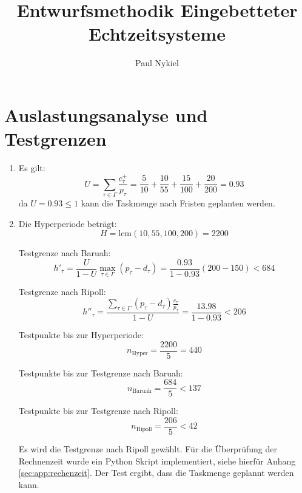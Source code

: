 \documentclass[DIN, pagenumber=false, fontsize=11pt, parskip=half]{scrartcl}
\title{Entwurfsmethodik Eingebetteter Echtzeitsysteme}
\author{Paul Nykiel}
\begin{document}
    \maketitle
    \section{Auslastungsanalyse und Testgrenzen}
    \begin{enumerate}[label=\alph*)]
        \item
            Es gilt:
            \begin{equation}
                U = \sum_{\tau \in \Gamma} \frac{c^+_\tau}{p_\tau}
                    = \frac{5}{10} + \frac{10}{55} + \frac{15}{100} + \frac{20}{200}
                    = 0.93
            \end{equation}
            da $U = 0.93 \leq 1$ kann die Taskmenge nach Fristen geplanten werden.
        \item
            Die Hyperperiode beträgt:
            \begin{equation}
                H = \text{lcm}(10, 55, 100, 200) = 2200
            \end{equation}
            
            Testgrenze nach Baruah:
            \begin{equation}
                h'_\tau = \frac{U}{1-U} \max_{\tau \in \Gamma} \left(p_\tau - d_\tau\right)
                        = \frac{0.93}{1-0.93} (200-150) < 684
            \end{equation} 

            Testgrenze nach Ripoll:
            \begin{equation}
                h''_\tau = \frac{\sum_{\tau \in \Gamma} (p_\tau - d_\tau) \frac{c_\tau}{p_\tau}}{1 - U} = \frac{13.98}{1-0.93} < 206
            \end{equation}

            Testpunkte bis zur Hyperperiode:
            \begin{equation}
                n_\text{Hyper} = \frac{2200}{5} = 440
            \end{equation}

            Testpunkte bis zur Testgrenze nach Baruah:
            \begin{equation}
                n_\text{Baruah} = \frac{684}{5} < 137
            \end{equation}

            Testpunkte bis zur Testgrenze nach Ripoll:
            \begin{equation}
                n_\text{Ripoll} = \frac{206}{5} < 42
            \end{equation}

            Es wird die Testgrenze nach Ripoll gewählt. Für die Überprüfung der Rechnenzeit
            wurde ein Python Skript implementiert, siehe hierfür Anhang 
            \ref{sec:app:rechenzeit}. Der Test ergibt, dass die Taskmenge geplannt werden
            kann.
    \end{enumerate}
\end{document}
